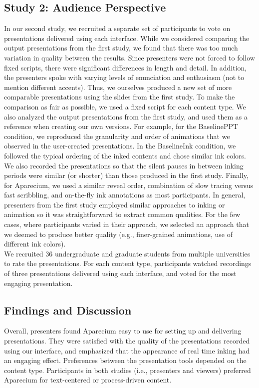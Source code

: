 \subsection{Study 2: Audience Perspective}
In our second study, we recruited a separate set of participants to vote on presentations delivered using each interface.
%
While we considered comparing the output presentations from the first study, we found that there was too much variation in quality between the results. Since presenters were not forced to follow fixed scripts, there were significant differences in length and detail. In addition, the presenters spoke with varying levels of enunciation and enthusiasm (not to mention different accents).
%
Thus, we ourselves produced a new set of more comparable presentations
using the slides from the first study.
%
To make the comparison as fair as possible, we used a fixed script for each content type.
We also analyzed the output presentations from the first study, and used them as a reference when creating our own versions. 
%
For example, for the BaselinePPT condition, we reproduced the granularity and order of animations that we observed in the user-created presentations.
In the BaselineInk condition, we followed the typical ordering of the inked contents and chose similar ink colors. We also recorded the presentations so that the silent pauses in between inking periods were similar (or shorter) than those produced in the first study. 
%
Finally, for Aparecium, we used a similar reveal order, combination of slow tracing versus fast scribbling, and on-the-fly ink annotations as most participants. 
%
In general, presenters from the first study employed similar approaches to inking or animation so it was straightforward to extract common qualities. For the few cases, where participants varied in their approach, we selected an approach that we deemed to produce better quality (e.g., finer-grained animations, use of different ink colors).\\
 
We recruited 36 undergraduate and graduate students from multiple universities to rate the presentations. For each content type, participants watched recordings of three presentations delivered using each interface, and voted for the most engaging presentation. 

\subsection{Findings and Discussion}
Overall, presenters found Aparecium easy to use for setting up and delivering presentations. They were satisfied with the quality of the presentations recorded using our interface, and emphasized that the appearance of real time inking had an engaging effect. 
Preferences between the presentation tools depended on the content type. Participants in both studies (i.e., presenters and viewers) preferred Aparecium for text-centered or process-driven content. \\

